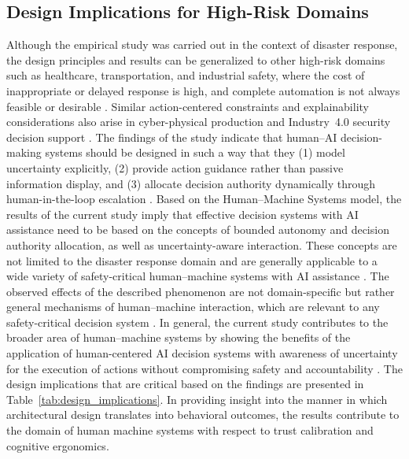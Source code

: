 \documentclass[journal]{IEEEtran}
\theoremstyle{plain}
\theoremstyle{definition}
\begin{document}
\subsection{Design Implications for High-Risk Domains}
Although the empirical study was carried out in the context of disaster response, the design principles and results can be generalized to other high-risk domains such as healthcare, transportation, and industrial safety, where the cost of inappropriate or delayed response is high, and complete automation is not always feasible or desirable \cite{PerezCerrolaza2024CSUR,Rao2024IJDRS,Rokhideh2025IJDRS,Birkmann2013NatHazards}. Similar action-centered constraints and explainability considerations also arise in cyber-physical production and Industry~4.0 security decision support \cite{Farhan2025TCE}.
The findings of the study indicate that human--AI decision-making systems should be designed in such a way that they (1) model uncertainty explicitly, (2) provide action guidance rather than passive information display, and (3) allocate decision authority dynamically through human-in-the-loop escalation \cite{Assaad2023TAS,Zhang2022THMS,Bach2024Access}.
Based on the Human--Machine Systems model, the results of the current study imply that effective decision systems with AI assistance need to be based on the concepts of bounded autonomy and decision authority allocation, as well as uncertainty-aware interaction. These concepts are not limited to the disaster response domain and are generally applicable to a wide variety of safety-critical human--machine systems with AI assistance \cite{Yang2022THMSReview,PerezCerrolaza2024CSUR}.
The observed effects of the described phenomenon are not domain-specific but rather general mechanisms of human--machine interaction, which are relevant to any safety-critical decision system \cite{Bach2024Access,Hodgson2013THMS}.
In general, the current study contributes to the broader area of human--machine systems by showing the benefits of the application of human-centered AI decision systems with awareness of uncertainty for the execution of actions without compromising safety and accountability \cite{Lai2023FAccT,Yang2022THMSReview}.
 The design implications that are critical based on the findings are presented in Table~\ref{tab:design_implications}.
In providing insight into the manner in which architectural design translates into behavioral outcomes, the results contribute to the domain of human machine systems with respect to trust calibration and cognitive ergonomics.

\end{document}
